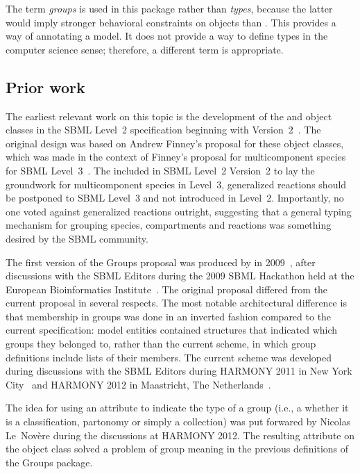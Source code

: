 The term \emph{groups} is used in this package rather than \emph{types}, because the latter would imply stronger behavioral constraints on objects than . This  provides a way of annotating a model.  It does not provide a way to define types in the computer science sense; therefore, a different term is appropriate.


\subsection{Prior work}

The earliest relevant work on this topic is the development of the \CompartmentType and \SpeciesType object classes in the SBML Level~2 specification beginning with Version~2~\citep{l2v2}. The original design was based on Andrew Finney's proposal for these object classes, which was made in the context of Finney's proposal for multicomponent species for SBML Level~3~\citep{finney_2004}. The \SpeciesType {} included in SBML Level~2 Version~2 to lay the groundwork for multicomponent species in Level~3,  generalized reactions should be postponed to SBML Level~3 and not introduced in Level~2. Importantly, no one voted against generalized reactions outright, suggesting that a general typing mechanism for grouping species, compartments and reactions was something desired by the SBML community.

The first version of the Groups proposal was produced by  in 2009~\citep{hucka_2009}, after discussions with the SBML Editors during the 2009 SBML Hackathon held at the European Bioinformatics Institute~\citep{sbml_hackathon_2009}.  The original proposal differed from the current proposal in several respects. The most notable architectural difference is that membership in groups was done in an inverted fashion compared to the current specification: model entities contained structures that indicated which groups they belonged to, rather than the current scheme, in which group definitions include lists of their members.  The current scheme was developed during discussions with the SBML Editors during HARMONY 2011 in New York City~\citep{harmony_2011} and HARMONY 2012 in Maastricht, The Netherlands~\citep{harmony_2012}.

The idea for using an attribute to indicate the type of a group (i.e., a whether it is a classification, partonomy or simply a collection) was put forwared by Nicolas Le~Nov\`{e}re during the discussions at HARMONY 2012.  The resulting attribute  on the \Group object class solved a problem of group meaning in the previous definitions of the Groups package.

